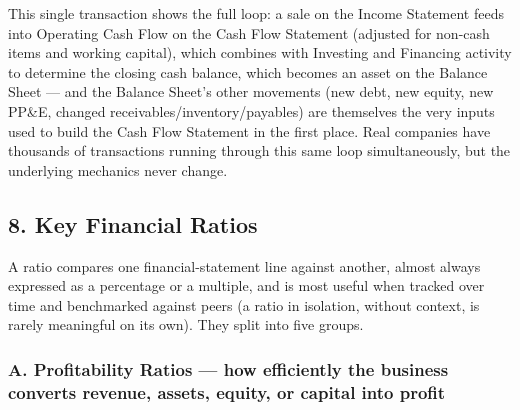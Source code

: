 \documentclass[12pt,openany]{book}
\begin{document}
This single transaction shows the full loop: a sale on the Income Statement feeds into Operating Cash Flow on the Cash Flow Statement (adjusted for non-cash items and working capital), which combines with Investing and Financing activity to determine the closing cash balance, which becomes an asset on the Balance Sheet --- and the Balance Sheet's other movements (new debt, new equity, new PP\&E, changed receivables/inventory/payables) are themselves the very inputs used to build the Cash Flow Statement in the first place. Real companies have thousands of transactions running through this same loop simultaneously, but the underlying mechanics never change.

\subsection{8. Key Financial Ratios}

A ratio compares one financial-statement line against another, almost always expressed as a percentage or a multiple, and is most useful when tracked over time and benchmarked against peers (a ratio in isolation, without context, is rarely meaningful on its own). They split into five groups.

\subsubsection{A. Profitability Ratios --- how efficiently the business converts revenue, assets, equity, or capital into profit}
\end{document}
